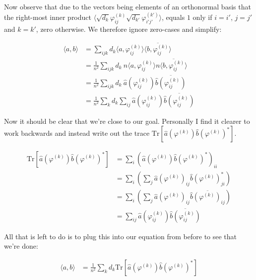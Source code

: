 \documentclass[12pt]{article}
\begin{document}
\noindent
Now observe that due to the vectors being elements of an orthonormal basis that the right-most inner product $\langle \sqrt{d_{k}} \varphi_{ij}^{(k)} \sqrt{d_{k'}} \varphi_{i'j'}^{(k')} \rangle$, equals $1$ only if $i = i'$, $j = j'$ and $k = k'$, zero otherwise. We therefore ignore zero-cases and simplify:

\begin{align*}
    \langle a, b \rangle &=
    \sum_{ijk} d_k \langle a, \varphi_{ij}^{(k)} \rangle \overline{ \langle b, \varphi_{ij}^{(k)} \rangle } \\
    &= \frac{1}{n^2} \sum_{ijk} d_k \ n \langle a, \varphi_{ij}^{(k)} \rangle n \overline{ \langle b, \varphi_{ij}^{(k)} \rangle } \\
    &= \frac{1}{n^2} \sum_{ijk} d_k \ \widehat{a}(\varphi_{ij}^{(k)}) \overline{ \widehat{b}(\varphi_{ij}^{(k)}) } \\
    &= \frac{1}{n^2} \sum_{k} d_k \sum_{ij} \widehat{a}(\varphi_{ij}^{(k)}) \overline{ \widehat{b}(\varphi_{ij}^{(k)}) }
\end{align*}

\noindent
Now it should be clear that we're close to our goal. Personally I find it clearer to work backwards and instead write out the trace $\mathrm{Tr}[\widehat{a}(\varphi^{(k)}) \widehat{b}(\varphi^{(k)})^{*}]$.

\begin{align*}
    \mathrm{Tr}[\widehat{a}(\varphi^{(k)}) \widehat{b}(\varphi^{(k)})^{*}]
    &= \sum_i \left( \widehat{a}(\varphi^{(k)}) \widehat{b}(\varphi^{(k)})^{*} \right)_{ii} \\
    &= \sum_i \left( \sum_j \widehat{a}(\varphi^{(k)})_{ij} \widehat{b}(\varphi^{(k)})_{ji}^{*} \right) \\
    &= \sum_i \left( \sum_j \widehat{a}(\varphi^{(k)})_{ij} \overline{ \widehat{b}(\varphi^{(k)})_{ij} } \right) \\
    &= \sum_{ij} \widehat{a}(\varphi_{ij}^{(k)}) \overline{ \widehat{b}(\varphi_{ij}^{(k)}) }
\end{align*}

\noindent
All that is left to do is to plug this into our equation from before to see that we're done:

\begin{align*}
    \langle a, b \rangle &=
    \frac{1}{n^2} \sum_{k} d_k \mathrm{Tr}[\widehat{a}(\varphi^{(k)}) \widehat{b}(\varphi^{(k)})^{*}]
\end{align*}
\end{document}
